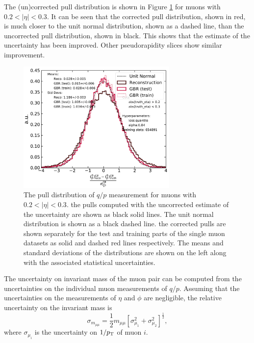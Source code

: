 The (un)corrected pull distribution is shown in Figure \ref{fig:muon:std-single}
for muons with $0.2 < |\eta| < 0.3$.
It can be seen that the corrected pull distribution, shown in red, is much closer
to the unit normal distribution, shown as a dashed line, than the uncorrected
pull distribution, shown in black. This shows that the estimate of the
uncertainty has been improved. Other pseudorapidity slices show similar improvement.
\begin{figure}[h!]
  \centering
  \includegraphics[width=0.7\textwidth]{figures/muons/vader-std-single}
  \caption[VADER4$\mu$ uncertainty correction on the single muon dataset]
  {The pull distribution of $q/p$ measurement for muons with $0.2 < |\eta| < 0.3$.
  the pulls computed with the uncorrected estimate of the uncertainty are shown
  as black solid lines. The unit normal distribution is shown as a black dashed
  line. the corrected pulls are shown separately for the test and training parts
  of the single muon datasets as solid and dashed red lines respectively.
  The means and standard deviations of the distributions are shown on the left
  along with the associated statistical uncertainties.
  }
  \label{fig:muon:std-single}
\end{figure}

The uncertainty on invariant mass of the muon pair can be computed from the 
uncertainties on the individual muon measurements of $q/p$. Assuming that the
uncertainties on the measurements of $\eta$ and $\phi$ are negligible, the
relative uncertainty on the invariant mass is
\begin{equation}
\sigma_{m_{\mu\mu}} = \frac{1}{2}m_{\mu\mu}
\left[ \sigma^2_{\mu_1} + \sigma^2_{\mu_2}\right]^\frac{1}{2},
\end{equation}
where $\sigma_{\mu_i}$ is the uncertainty on $1/p_{\text{T}}$ of muon $i$.

